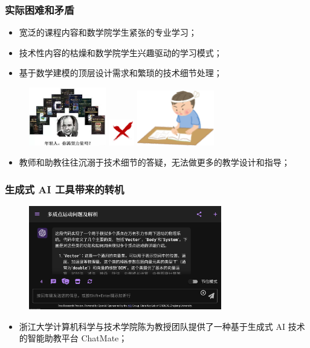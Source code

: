 \documentclass{beamer}
\begin{document}
\begin{frame}
    \frametitle{实际困难和矛盾}
    \begin{itemize}
        \item 宽泛的课程内容和数学院学生紧张的专业学习；
        \item 技术性内容的枯燥和数学院学生兴趣驱动的学习模式；
        \item 基于数学建模的顶层设计需求和繁琐的技术细节处理；
    \end{itemize}
    \begin{figure}
        \centering 
    \includegraphics[width=0.3\textwidth]{images/computerbook.png}
    \includegraphics[width=0.1\textwidth]{images/x.png}
    \includegraphics[width=0.3\textwidth]{images/hard.png}
    \end{figure}    
    \begin{itemize}
        \item<2-> 教师和助教往往沉溺于技术细节的答疑，无法做更多的教学设计和指导；
    \end{itemize}
\end{frame}

\begin{frame}
    \frametitle{生成式 AI 工具带来的转机}
    \begin{figure}
        \centering
        \includegraphics[width=0.75\textwidth]{images/ChatMate.png}
    \end{figure}
    \begin{itemize}
        \item 浙江大学计算机科学与技术学院{\hei 陈为教授}团队提供了一种基于生成式 AI 技术的智能助教平台 {\hei ChatMate}；
    \end{itemize}
\end{frame}
\end{document}
